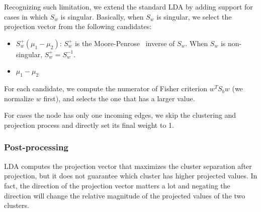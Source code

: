 Recognizing such limitation, we extend the standard LDA by adding support for cases in which $S_w$ is singular.
Basically, when $S_w$ is singular, we select the projection vector from the following candidates:

\begin{itemize}[noitemsep, topsep=1pt, partopsep=1pt, listparindent=\parindent, leftmargin=*]

    \item $S_w^{+}(\mu_1-\mu_2)$: $S_w^{+}$ is the Moore-Penrose~\cite{albert1972regression} inverse of $S_w$. When $S_w$ is non-singular, $S_w^{+} = S_w^{-1}$.

    \item $\mu_1-\mu_2$
\end{itemize}
For each candidate, we compute the numerator of Fisher criterion $w^TS_bw$ (we normalize $w$ first), and selects the one that has a larger value.


For cases the node has only one incoming edges, we skip the clustering and projection process and directly set its final weight to 1.



\subsubsection{Post-processing}
LDA computes the projection vector that maximizes the cluster separation after projection, but it does not guarantee which cluster has higher projected values.  
In fact, the direction of the projection vector matters a lot and negating the direction will change the relative magnitude of the projected values of the two clusters.


